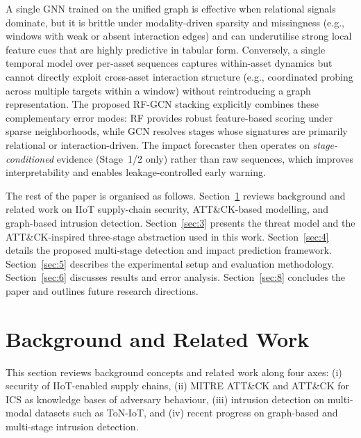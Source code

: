 \documentclass[pdflatex,sn-mathphys-num]{sn-jnl}
\theoremstyle{thmstyleone}%
\theoremstyle{thmstyletwo}%
\theoremstyle{thmstylethree}%
\begin{document}
A single GNN trained on the unified graph is effective when relational signals dominate, but it is brittle under modality-driven sparsity and missingness (e.g., windows with weak or absent interaction edges) and can underutilise strong local feature cues that are highly predictive in tabular form. Conversely, a single temporal model over per-asset sequences captures within-asset dynamics but cannot directly exploit cross-asset interaction structure (e.g., coordinated probing across multiple targets within a window) without reintroducing a graph representation. The proposed RF-GCN stacking explicitly combines these complementary error modes: RF provides robust feature-based scoring under sparse neighborhoods, while GCN resolves stages whose signatures are primarily relational or interaction-driven. The impact forecaster then operates on \emph{stage-conditioned} evidence (Stage~1/2 only) rather than raw sequences, which improves interpretability and enables leakage-controlled early warning.


The rest of the paper is organised as follows. Section~\ref{sec:2} reviews background and related work on IIoT supply-chain security, ATT\&CK-based modelling, and graph-based intrusion detection. Section~\ref{sec:3} presents the threat model and the ATT\&CK-inspired three-stage abstraction used in this work. Section~\ref{sec:4} details the proposed multi-stage detection and impact prediction framework. Section~\ref{sec:5} describes the experimental setup and evaluation methodology. Section~\ref{sec:6} discusses results and error analysis. Section~\ref{sec:8} concludes the paper and outlines future research directions.


\section{Background and Related Work}
\label{sec:2}

This section reviews background concepts and related work along four axes: (i) security of IIoT-enabled supply chains, (ii) MITRE ATT\&CK and ATT\&CK for ICS as knowledge bases of adversary behaviour, (iii) intrusion detection on multi-modal datasets such as ToN-IoT, and (iv) recent progress on graph-based and multi-stage intrusion detection.
\end{document}
